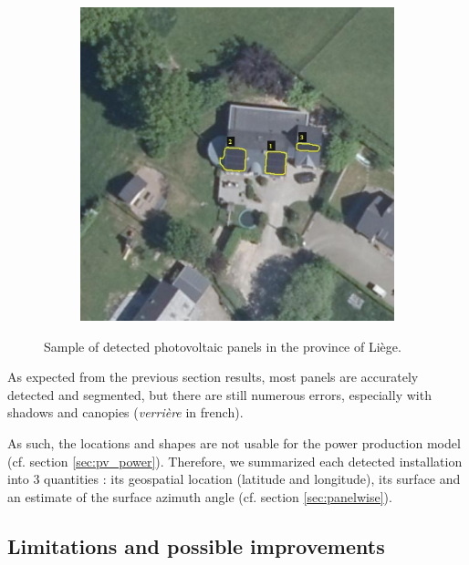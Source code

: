 \documentclass[a4paper, 12pt]{article}
\begin{document}
\begin{figure}[h]
\begin{subfigure}{0.31\textwidth}
		\vspace{0em}
	\end{subfigure}
	\hspace{0.5em}
	\begin{subfigure}{0.31\textwidth}
		\centering
		\includegraphics[width=\textwidth]{resources/jpg/609690_533553.jpg}
		\vspace{0em}
	\end{subfigure}
    \caption{Sample of detected photovoltaic panels in the province of Liège.}
\end{figure}

As expected from the previous section results, most panels are accurately detected and segmented, but there are still numerous errors, especially with shadows and canopies (\emph{verrière} in french).

\begin{note}
    As such, the locations and shapes are not usable for the power production model (cf. section \ref{sec:pv_power}). Therefore, we summarized each detected installation into 3 quantities : its geospatial location (latitude and longitude), its surface and an estimate of the surface azimuth angle (cf. section \ref{sec:panelwise}).
\end{note}

\subsection{Limitations and possible improvements}
\end{document}
